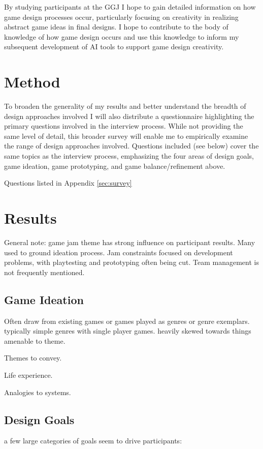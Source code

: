\documentclass{sig-alternate}
\begin{document}
By studying participants at the GGJ I hope to gain detailed information on how game design processes occur, particularly focusing on creativity in realizing abstract game ideas in final designs. I hope to contribute to the body of knowledge of how game design occurs and use this knowledge to inform my subsequent development of AI tools to support game design creativity. 

\section{Method}
To broaden the generality of my results and better understand the breadth of design approaches involved I will also distribute a questionnaire highlighting the primary questions involved in the interview process. While not providing the same level of detail, this broader survey will enable me to empirically examine the range of design approaches involved. Questions included (see below) cover the same topics as the interview process, emphasizing the four areas of design goals, game ideation, game prototyping, and game balance/refinement above.

Questions listed in Appendix \ref{sec:survey}

\section{Results}
General note: game jam theme has strong influence on participant results. Many used to ground ideation process. Jam constraints focused on development problems, with playtesting and prototyping often being cut. Team management is not frequently mentioned.

\subsection{Game Ideation}
Often draw from existing games or games played as genres or genre exemplars. typically simple genres with single player games. heavily skewed towards things amenable to theme.

Themes to convey.

Life experience.

Analogies to systems.

\subsection{Design Goals}
a few large categories of goals seem to drive participants:
\end{document}
